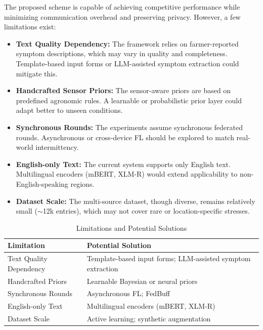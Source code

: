 \documentclass[10pt,journal,compsoc]{IEEEtran}
\begin{document}
The proposed scheme is capable of achieving competitive performance while minimizing communication overhead and preserving privacy. However, a few limitations exist:

\begin{itemize}
    \item \textbf{Text Quality Dependency:} The framework relies on farmer-reported symptom descriptions, which may vary in quality and completeness. Template-based input forms or LLM-assisted symptom extraction could mitigate this.

    \item \textbf{Handcrafted Sensor Priors:} The sensor-aware priors are based on predefined agronomic rules. A learnable or probabilistic prior layer could adapt better to unseen conditions.

    \item \textbf{Synchronous Rounds:} The experiments assume synchronous federated rounds. Asynchronous or cross-device FL should be explored to match real-world intermittency.

    \item \textbf{English-only Text:} The current system supports only English text. Multilingual encoders (mBERT, XLM-R) would extend applicability to non-English-speaking regions.

    \item \textbf{Dataset Scale:} The multi-source dataset, though diverse, remains relatively small ($\sim$12k entries), which may not cover rare or location-specific stresses.
\end{itemize}

\begin{table}[!t]
\centering
\caption{Limitations and Potential Solutions}
\label{tab:limitations}
\small
\begin{tabular}{p{2.5cm}p{5cm}}
\toprule
\textbf{Limitation} & \textbf{Potential Solution} \\
\midrule
Text Quality Dependency & Template-based input forms; LLM-assisted symptom extraction \\
\midrule
Handcrafted Priors & Learnable Bayesian or neural priors \\
\midrule
Synchronous Rounds & Asynchronous FL; FedBuff \\
\midrule
English-only Text & Multilingual encoders (mBERT, XLM-R) \\
\midrule
Dataset Scale & Active learning; synthetic augmentation \\
\bottomrule
\end{tabular}
\end{table}
\end{document}
